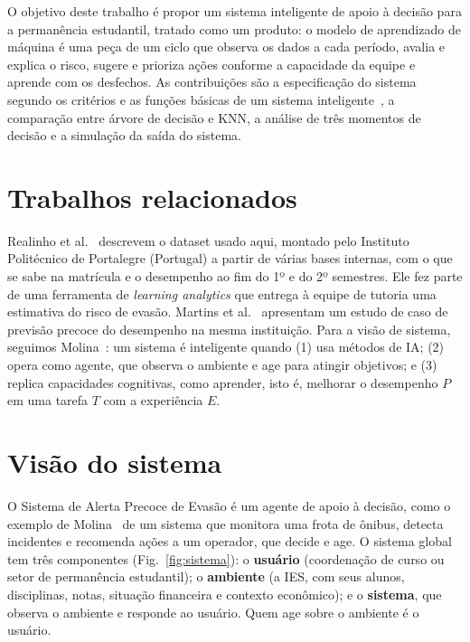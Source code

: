 \documentclass[runningheads]{llncs}
\begin{document}
O objetivo deste trabalho é propor um sistema inteligente de apoio à decisão para a
permanência estudantil, tratado como um produto: o modelo de aprendizado de máquina é uma peça de um ciclo que observa os dados a cada período, avalia e explica o
risco, sugere e prioriza ações conforme a capacidade da equipe e aprende com os
desfechos. As contribuições são a especificação do sistema segundo os critérios e as
funções básicas de um sistema inteligente~\cite{molina2020}, a comparação entre árvore
de decisão e KNN, a análise de três momentos de decisão e a simulação da saída do
sistema.

\section{Trabalhos relacionados}

Realinho et al.~\cite{realinho2022} descrevem o dataset usado aqui, montado pelo
Instituto Politécnico de Portalegre (Portugal) a partir de várias bases internas, com o
que se sabe na matrícula e o desempenho ao fim do 1º e do 2º semestres. Ele fez parte
de uma ferramenta de \emph{learning analytics} que entrega à equipe de tutoria uma
estimativa do risco de evasão. Martins et al.~\cite{martins2021} apresentam um estudo de
caso de previsão precoce do desempenho na mesma instituição. Para a visão de sistema,
seguimos Molina~\cite{molina2020}: um sistema é inteligente quando
(1) usa métodos de IA; (2) opera como agente, que observa o ambiente e age para atingir
objetivos; e (3) replica capacidades cognitivas, como aprender, isto é, melhorar o
desempenho $P$ em uma tarefa $T$ com a experiência $E$.

\section{Visão do sistema}

O Sistema de Alerta Precoce de Evasão é um agente de apoio à decisão, como o exemplo
de Molina~\cite{molina2020} de um sistema que monitora uma frota de ônibus, detecta
incidentes e recomenda ações a um operador, que decide e age. O sistema global tem três
componentes (Fig.~\ref{fig:sistema}): o \textbf{usuário} (coordenação de curso ou setor
de permanência estudantil); o \textbf{ambiente} (a IES, com seus alunos, disciplinas,
notas, situação financeira e contexto econômico); e o \textbf{sistema}, que observa o
ambiente e responde ao usuário. Quem age sobre o ambiente é o usuário.
\end{document}
